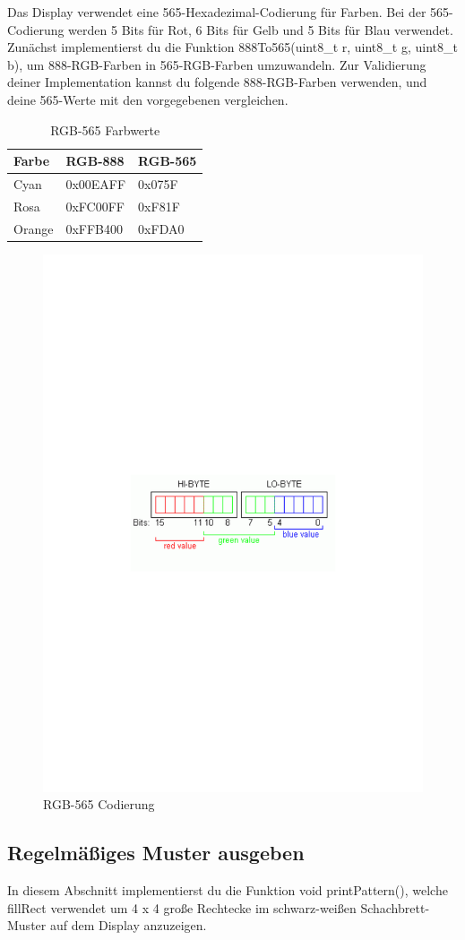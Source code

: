 Das Display verwendet eine 565-Hexadezimal-Codierung für Farben. Bei der 565-Codierung werden 5 Bits für Rot, 6 Bits für Gelb und 5 Bits für Blau verwendet.
Zunächst implementierst du die Funktion 888To565(uint8\_t r, uint8\_t g, uint8\_t b), um 888-RGB-Farben in 565-RGB-Farben umzuwandeln. Zur Validierung deiner Implementation kannst du folgende 888-RGB-Farben verwenden, und deine 565-Werte mit den vorgegebenen vergleichen.

\begin{table}[]
	\centering
	\caption{RGB-565 Farbwerte}
	\label{rgb565Table}
	\begin{tabular}{|l|l|l|}
		\hline
		\textbf{Farbe} & \textbf{RGB-888} & \textbf{RGB-565} \\ \hline
		Cyan & 0x00EAFF & 0x075F \\ \hline
		Rosa & 0xFC00FF & 0xF81F \\ \hline
		Orange & 0xFFB400 & 0xFDA0 \\ \hline
	\end{tabular}
\end{table}

\begin{figure}
	\begin{centering}
		\includegraphics[width=.5\textwidth]{./05_c/figures/rgb565}
		\caption{RGB-565 Codierung}
		\label{fig:rgb565}
	\end{centering}
\end{figure}


\subsection{Regelmäßiges Muster ausgeben}
In diesem Abschnitt implementierst du die Funktion void printPattern(), welche fillRect verwendet um 4 x 4 große Rechtecke im schwarz-weißen Schachbrett-Muster auf dem Display anzuzeigen.
